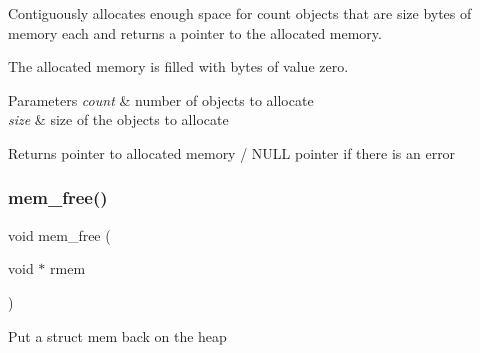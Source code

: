 Contiguously allocates enough space for count objects that are size bytes of memory each and returns a pointer to the allocated memory.

The allocated memory is filled with bytes of value zero.


\begin{DoxyParams}{Parameters}
{\em count} & number of objects to allocate \\
\hline
{\em size} & size of the objects to allocate \\
\hline
\end{DoxyParams}
\begin{DoxyReturn}{Returns}
pointer to allocated memory / N\+U\+LL pointer if there is an error 
\end{DoxyReturn}
\mbox{\label{openmote-cc2538_2lwip_2src_2include_2lwip_2mem_8h_a2fd7aa1adf6e394d3be7c7734e7df41a}} 
\subsubsection{\texorpdfstring{mem\+\_\+free()}{mem\_free()}}
{\footnotesize\ttfamily void mem\+\_\+free (\begin{DoxyParamCaption}\item[{void $\ast$}]{rmem }\end{DoxyParamCaption})}

Put a struct mem back on the heap


